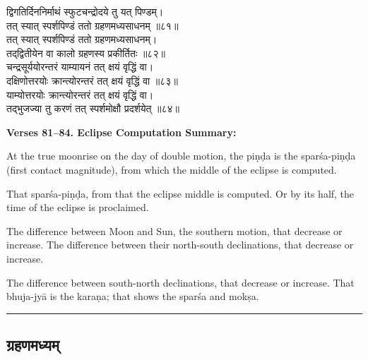 \documentclass[11pt,a4paper]{article}
\newcommand{\longline}{\noindent\rule{\textwidth}{0.4pt}}
\newcommand{\dev}[1]{{\devanagarifont #1}}
\newcommand{\sectsep}{\par\vspace{0.8em}\longline\vspace{0.8em}}
\begin{document}
\begin{minipage}[t]{0.48\textwidth}
\small\devanagarifont
द्विगतिर्दिननिर्माथं स्फुटचन्द्रोदये तु यत् पिण्डम्।\\
तत् स्यात् स्पर्शपिण्डं ततो ग्रहणमध्यसाधनम् ॥८१॥\\[0.5em]
तत् स्यात् स्पर्शपिण्डं ततो ग्रहणमध्यसाधनम्।\\
तद्‌द्वितीयेन वा कालो ग्रहणस्य प्रकीर्तितः ॥८२॥\\[0.5em]
चन्द्रसूर्ययोरन्तरं याम्यायनं तत् क्षयं वृद्धिं वा।\\
दक्षिणोत्तरयोः क्रान्त्योरन्तरं तत् क्षयं वृद्धिं वा ॥८३॥\\[0.5em]
याम्योत्तरयोः क्रान्त्योरन्तरं तत् क्षयं वृद्धिं वा।\\
तद्‌भुजज्या तु करणं तत् स्पर्शमोक्षौ प्रदर्शयेत् ॥८४॥
\end{minipage}%
\hfill
\begin{minipage}[t]{0.48\textwidth}
\small
\textbf{Verses 81--84. Eclipse Computation Summary:}

At the true moonrise on the day of double motion, the pi\d{n}\d{d}a is the spar\'sa-pi\d{n}\d{d}a (first contact magnitude), from which the middle of the eclipse is computed.

That spar\'sa-pi\d{n}\d{d}a, from that the eclipse middle is computed. Or by its half, the time of the eclipse is proclaimed.

The difference between Moon and Sun, the southern motion, that decrease or increase. The difference between their north-south declinations, that decrease or increase.

The difference between south-north declinations, that decrease or increase. That bhuja-jy\=a is the kara\d{n}a; that shows the spar\'sa and mok\d{s}a.
\end{minipage}

\sectsep

\subsection{\dev{ग्रहणमध्यम्}}
\end{document}
